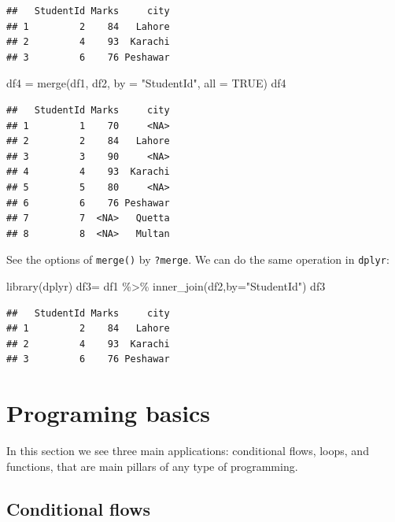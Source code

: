 \documentclass[
]{book}
\newenvironment{Shaded}{\begin{snugshade}}{\end{snugshade}}
\newcommand{\AttributeTok}[1]{\textcolor[rgb]{0.77,0.63,0.00}{#1}}
\newcommand{\ConstantTok}[1]{\textcolor[rgb]{0.00,0.00,0.00}{#1}}
\newcommand{\FunctionTok}[1]{\textcolor[rgb]{0.00,0.00,0.00}{#1}}
\newcommand{\NormalTok}[1]{#1}
\newcommand{\OtherTok}[1]{\textcolor[rgb]{0.56,0.35,0.01}{#1}}
\newcommand{\SpecialCharTok}[1]{\textcolor[rgb]{0.00,0.00,0.00}{#1}}
\newcommand{\StringTok}[1]{\textcolor[rgb]{0.31,0.60,0.02}{#1}}
\begin{document}
\begin{verbatim}
##   StudentId Marks     city
## 1         2    84   Lahore
## 2         4    93  Karachi
## 3         6    76 Peshawar
\end{verbatim}

\begin{Shaded}
\begin{Highlighting}[]
\NormalTok{df4 }\OtherTok{=} \FunctionTok{merge}\NormalTok{(df1, df2, }\AttributeTok{by =} \StringTok{"StudentId"}\NormalTok{, }\AttributeTok{all =} \ConstantTok{TRUE}\NormalTok{)}
\NormalTok{df4}
\end{Highlighting}
\end{Shaded}

\begin{verbatim}
##   StudentId Marks     city
## 1         1    70     <NA>
## 2         2    84   Lahore
## 3         3    90     <NA>
## 4         4    93  Karachi
## 5         5    80     <NA>
## 6         6    76 Peshawar
## 7         7  <NA>   Quetta
## 8         8  <NA>   Multan
\end{verbatim}

See the options of \texttt{merge()} by \texttt{?merge}. We can do the same operation in \texttt{dplyr}:

\begin{Shaded}
\begin{Highlighting}[]
\FunctionTok{library}\NormalTok{(dplyr)}
\NormalTok{df3}\OtherTok{=}\NormalTok{ df1 }\SpecialCharTok{\%\textgreater{}\%} \FunctionTok{inner\_join}\NormalTok{(df2,}\AttributeTok{by=}\StringTok{"StudentId"}\NormalTok{)}
\NormalTok{df3}
\end{Highlighting}
\end{Shaded}

\begin{verbatim}
##   StudentId Marks     city
## 1         2    84   Lahore
## 2         4    93  Karachi
## 3         6    76 Peshawar
\end{verbatim}

\hypertarget{programing-basics}{%
\chapter{Programing basics}\label{programing-basics}}

In this section we see three main applications: conditional flows, loops, and functions, that are main pillars of any type of programming.

\hypertarget{conditional-flows}{%
\section{Conditional flows}\label{conditional-flows}}
\end{document}

